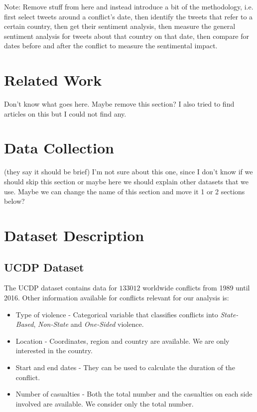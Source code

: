 \documentclass[11pt]{article}
\begin{document}
Note: Remove stuff from here and instead introduce a bit of the methodology, i.e.  first select tweets around a conflict's date, then identify the tweets that refer to a certain country, then get their sentiment analysis, then measure the general sentiment analysis for tweets about that country on that date, then compare for dates before and after the conflict to measure the sentimental impact.


\section{Related Work}
Don't know what goes here. Maybe remove this section? I also tried to find articles on this but I could not find any.


\section{Data Collection}
(they say it should be brief) I'm not sure about this one, since I don't know if we should skip this section or maybe here we should explain other datasets that we use. Maybe we can change the name of this section and move it 1 or 2 sections below?


\section{Dataset Description}
  \subsection{UCDP Dataset}
  \label{sub:ucdp_dataset}
  The UCDP dataset contains data for $133 012$ worldwide conflicts from 1989 until 2016. Other information available for  conflicts relevant for our analysis is:
  \begin{itemize}
    \item Type of violence - Categorical variable that classifies conflicts into \emph{State-Based},  \emph{Non-State} and \emph{One-Sided} violence.
    \item Location - Coordinates, region and country are available. We are only interested in the country.
    \item Start and end dates - They can be used to calculate the duration of the conflict.
    \item Number of casualties - Both the total number and the casualties on each side involved are available. We consider only the total number.
  \end{itemize}
\end{document}
